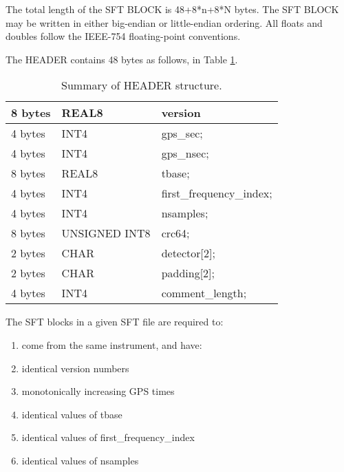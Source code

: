 \documentclass{ligodcc}
\begin{document}
The total length of the SFT BLOCK is 48+8*n+8*N bytes.  The SFT BLOCK
may be written in either big-endian or little-endian ordering.  All
floats and doubles follow the IEEE-754 floating-point conventions.

The HEADER contains 48 bytes as follows, in Table \ref{tab:header}.


\begin{table}[ht]
\centering
\begin{tabular}{|l|l|l|}
\hline

8 bytes  &REAL8  &version\\
\hline

4 bytes  &INT4   &gps\_sec;\\
\hline

4 bytes  &INT4   &gps\_nsec;\\
\hline

8 bytes  &REAL8  &tbase;\\
\hline

4 bytes  &INT4   &first\_frequency\_index;\\
\hline

4 bytes  &INT4   &nsamples;\\
\hline

8 bytes  &UNSIGNED INT8   &crc64;\\
\hline

2 bytes  &CHAR   &detector[2];\\
\hline

2 bytes  &CHAR   &padding[2];\\
\hline

4 bytes  &INT4   &comment\_length;\\
\hline
\end{tabular}
\caption{Summary of HEADER structure.}
\label{tab:header}
\end{table}

The SFT blocks in a given SFT file are required to:

\begin{enumerate}
\item come from the same instrument, and have:
\item identical version numbers
\item monotonically increasing GPS times
\item identical values of tbase
\item identical values of first\_frequency\_index
\item identical values of nsamples
\end{enumerate}
\end{document}
